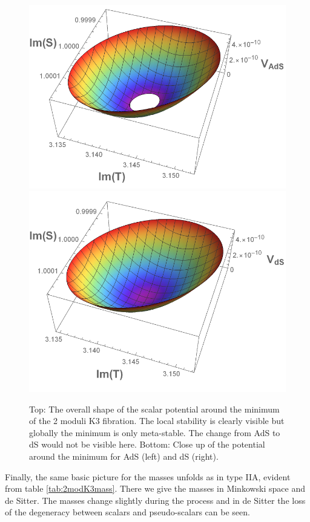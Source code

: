\documentclass[a4paper,12pt,twoside,openright]{report}
\begin{document}
\begin{figure}[H]
\centering
\includegraphics[scale=0.55]{quevedo_314_3D_Ads.pdf} \qquad
\includegraphics[scale=0.53]{quevedo_314_3D_ds.pdf}
\caption{Top: The overall shape of the scalar potential around the minimum of the 2 moduli K3 fibration. The local stability is clearly visible but globally the minimum is only meta-stable. The change from AdS to dS would not be visible here. Bottom: Close up of the potential around the minimum for AdS (left) and dS (right).}
\label{fig:2modK33d}
\end{figure}
Finally, the same basic picture for the masses unfolds as in type IIA, evident from table \ref{tab:2modK3mass}. There we give the masses in Minkowski space and de Sitter. The masses change slightly during the process and in de Sitter the loss of the degeneracy between scalars and pseudo-scalars can be seen.
\end{document}
